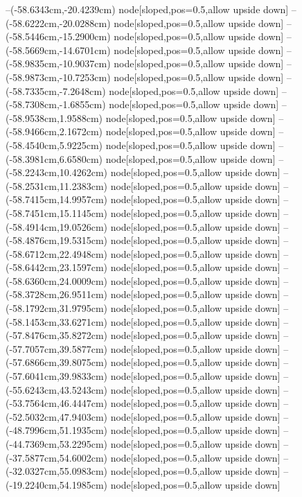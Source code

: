 --(-58.6343cm,-20.4239cm) node[sloped,pos=0.5,allow upside down]{\ArrowIn}
--(-58.6222cm,-20.0288cm) node[sloped,pos=0.5,allow upside down]{\arrowIn}
--(-58.5446cm,-15.2900cm) node[sloped,pos=0.5,allow upside down]{\ArrowIn}
--(-58.5669cm,-14.6701cm) node[sloped,pos=0.5,allow upside down]{\arrowIn}
--(-58.9835cm,-10.9037cm) node[sloped,pos=0.5,allow upside down]{\ArrowIn}
--(-58.9873cm,-10.7253cm) node[sloped,pos=0.5,allow upside down]{\arrowIn}
--(-58.7335cm,-7.2648cm) node[sloped,pos=0.5,allow upside down]{\ArrowIn}
--(-58.7308cm,-1.6855cm) node[sloped,pos=0.5,allow upside down]{\ArrowIn}
--(-58.9538cm,1.9588cm) node[sloped,pos=0.5,allow upside down]{\ArrowIn}
--(-58.9466cm,2.1672cm) node[sloped,pos=0.5,allow upside down]{\arrowIn}
--(-58.4540cm,5.9225cm) node[sloped,pos=0.5,allow upside down]{\ArrowIn}
--(-58.3981cm,6.6580cm) node[sloped,pos=0.5,allow upside down]{\arrowIn}
--(-58.2243cm,10.4262cm) node[sloped,pos=0.5,allow upside down]{\ArrowIn}
--(-58.2531cm,11.2383cm) node[sloped,pos=0.5,allow upside down]{\arrowIn}
--(-58.7415cm,14.9957cm) node[sloped,pos=0.5,allow upside down]{\ArrowIn}
--(-58.7451cm,15.1145cm) node[sloped,pos=0.5,allow upside down]{\arrowIn}
--(-58.4914cm,19.0526cm) node[sloped,pos=0.5,allow upside down]{\ArrowIn}
--(-58.4876cm,19.5315cm) node[sloped,pos=0.5,allow upside down]{\arrowIn}
--(-58.6712cm,22.4948cm) node[sloped,pos=0.5,allow upside down]{\ArrowIn}
--(-58.6442cm,23.1597cm) node[sloped,pos=0.5,allow upside down]{\arrowIn}
--(-58.6360cm,24.0009cm) node[sloped,pos=0.5,allow upside down]{\arrowIn}
--(-58.3728cm,26.9511cm) node[sloped,pos=0.5,allow upside down]{\ArrowIn}
--(-58.1792cm,31.9795cm) node[sloped,pos=0.5,allow upside down]{\ArrowIn}
--(-58.1453cm,33.6271cm) node[sloped,pos=0.5,allow upside down]{\ArrowIn}
--(-57.8476cm,35.8272cm) node[sloped,pos=0.5,allow upside down]{\ArrowIn}
--(-57.7057cm,39.5877cm) node[sloped,pos=0.5,allow upside down]{\ArrowIn}
--(-57.6866cm,39.8075cm) node[sloped,pos=0.5,allow upside down]{\arrowIn}
--(-57.6041cm,39.9833cm) node[sloped,pos=0.5,allow upside down]{\arrowIn}
--(-55.6243cm,43.5243cm) node[sloped,pos=0.5,allow upside down]{\ArrowIn}
--(-53.7564cm,46.4447cm) node[sloped,pos=0.5,allow upside down]{\ArrowIn}
--(-52.5032cm,47.9403cm) node[sloped,pos=0.5,allow upside down]{\ArrowIn}
--(-48.7996cm,51.1935cm) node[sloped,pos=0.5,allow upside down]{\ArrowIn}
--(-44.7369cm,53.2295cm) node[sloped,pos=0.5,allow upside down]{\ArrowIn}
--(-37.5877cm,54.6002cm) node[sloped,pos=0.5,allow upside down]{\ArrowIn}
--(-32.0327cm,55.0983cm) node[sloped,pos=0.5,allow upside down]{\ArrowIn}
--(-19.2240cm,54.1985cm) node[sloped,pos=0.5,allow upside down]{\ArrowIn}
